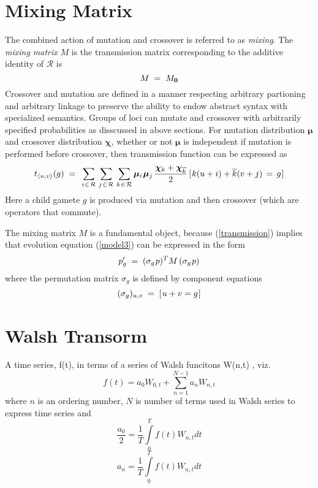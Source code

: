 \section{Mixing Matrix}
The combined action of mutation and crossover is referred to as {\em mixing}.
The {\em mixing matrix\/} $M$ is the transmission matrix corresponding to the 
additive identity of $\mathcal{R}$ is
\[
M \; = \; M_{\bf 0}\\[-0.01in]
\]
Crossover and mutation are defined in a manner respecting arbitrary partioning and arbitrary linkage to preserve the ability to endow abstract syntax with specialized semantics. Groups of loci can mutate and crossover with arbitrarily specified probabilities as disscussed in above sections. For mutation distribution $\bm{\mu}$ and crossover distribution $\bm{\chi}$, whether or not $\bm{\mu}$ is independent if mutation is performed before crossover, then transmission function can be expressed as \cite{VoseWright1998}
\begin{equation}
\label{transmission}
t_{\langle u,v \rangle}(g) \; = \;\,
\sum_{i \hspace{0.01in} \in \hspace{0.01in} \mathcal{R}} \, \sum_{j \hspace{0.01in} \in \hspace{0.01in} \mathcal{R}} \,
\sum_{k \hspace{0.01in} \in \hspace{0.01in} \mathcal{R}}
\bm{\mu}_i \hspace{0.01in} \bm{\mu}_j \, \frac{\bm{\chi}_k + \bm{\chi}_{\overline{k}}}{2} \,
[\hspace{0.01in} k (u + i) + \overline{k}(v + j) \, = \, g\hspace{0.01in}]
\end{equation}
Here a child gamete $g$ is produced via mutation and then crossover (which are operators that
commute). 

The mixing matrix $M$ is a fundamental object, because (\ref{transmission}) implies that evolution equation (\ref{model3}) can be expressed in the form
\begin{equation}
\label{model4}
p_g^\prime \; = \; (\sigma_g \hspace{0.01in} p)^T M \, (\sigma_g \hspace{0.01in} p)
\end{equation}
where the permutation matrix $\sigma_g$ is defined by component equations
\[
(\sigma_g)_{u,v} \; = \; [\hspace{0.01in} u+v = g\hspace{0.01in} ]
\]

\section{Walsh Transorm}
A time series, f(t), in terms of a series of Walsh funcitons W(n,t) \cite{Beauchamp1975}, viz.
\[
f(t) = a_{0} W_{0,t} + \sum_{n=1}^{N-1} a_n W_{n,t}
\]
where $n$ is an ordering number, $N$ is number of terms used in Walsh series to express time series and
\[
\frac{a_0}{2} = \frac{1}{T} \int\limits_0^T f(t) W_{n,t} dt
\]
\[
a_n = \frac{1}{T} \int\limits_0^T f(t) W_{n,t} dt
\]

